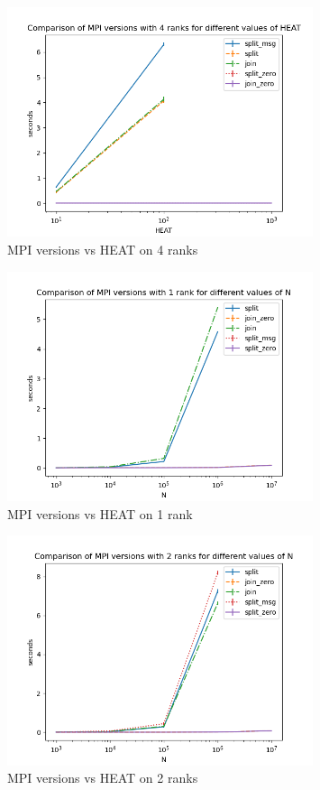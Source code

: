 \documentclass[a4paper]{article}
\begin{document}
\begin{figure}[H]
    \centering
    \includegraphics[width = 0.8\textwidth]{graphs/heat/Comparison of MPI versions with 4 ranks for different values of HEAT.png}
    \caption{MPI versions vs HEAT on 4 ranks}
    \label{fig: orig heat}
\end{figure}

\begin{figure}[H]
    \centering
    \includegraphics[width = 0.8\textwidth]{graphs/n/Comparison of MPI versions with 1 rank for different values of N.png}
    \caption{MPI versions vs HEAT on 1 rank}
    \label{fig: orig heat}
\end{figure}

\begin{figure}[H]
    \centering
    \includegraphics[width = 0.8\textwidth]{graphs/n/Comparison of MPI versions with 2 ranks for different values of N.png}
    \caption{MPI versions vs HEAT on 2 ranks}
    \label{fig: orig heat}
\end{figure}
\end{document}
